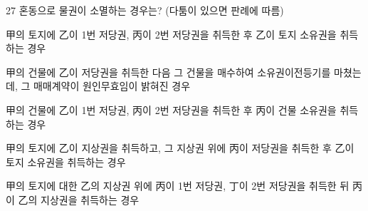\begin{question}{27}
혼동으로 물권이 소멸하는 경우는? (다툼이 있으면 판례에 따름)
\begin{choices}
  \item 甲의 토지에 乙이 1번 저당권, 丙이 2번 저당권을 취득한 후 乙이 토지 소유권을 취득하는 경우
  \item 甲의 건물에 乙이 저당권을 취득한 다음 그 건물을 매수하여 소유권이전등기를 마쳤는데, 그 매매계약이 원인무효임이 밝혀진 경우
  \item 甲의 건물에 乙이 1번 저당권, 丙이 2번 저당권을 취득한 후 丙이 건물 소유권을 취득하는 경우
  \item 甲의 토지에 乙이 지상권을 취득하고, 그 지상권 위에 丙이 저당권을 취득한 후 乙이 토지 소유권을 취득하는 경우
  \item 甲의 토지에 대한 乙의 지상권 위에 丙이 1번 저당권, 丁이 2번 저당권을 취득한 뒤 丙이 乙의 지상권을 취득하는 경우
\end{choices}
\end{question}

